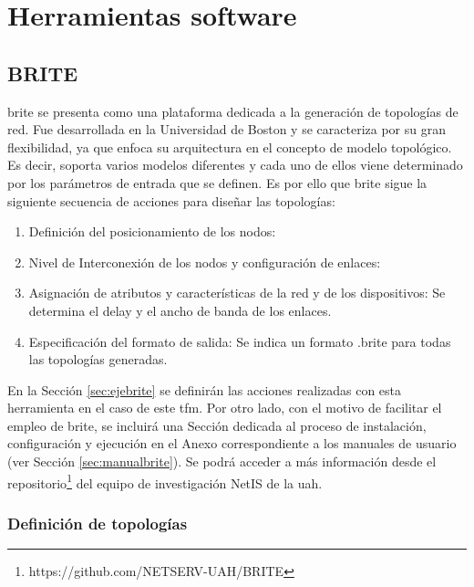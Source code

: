 \section{Herramientas software}
\label{sec:software}

\subsection{BRITE}
\label{sec:brite}

\gls{brite} \cite{brite} se presenta como una plataforma dedicada a la generación de topologías de red. Fue desarrollada en la Universidad de Boston y se caracteriza por su gran flexibilidad, ya que enfoca su arquitectura en el concepto de modelo topológico. Es decir, soporta varios modelos diferentes y cada uno de ellos viene determinado por los parámetros de entrada que se definen. Es por ello que \gls{brite} sigue la siguiente secuencia de acciones para diseñar las topologías:

\vspace{3mm}

\begin{enumerate}
    \item Definición del posicionamiento de los nodos:
    \item Nivel de Interconexión de los nodos y configuración de enlaces:
    \item Asignación de atributos y características de la red y de los dispositivos: Se determina el delay y el ancho de banda de los enlaces.
    \item Especificación del formato de salida: Se indica un formato .brite para todas las topologías generadas.
\end{enumerate}

\vspace{3mm}

En la Sección \ref{sec:ejebrite} se definirán las acciones realizadas con esta herramienta en el caso de este \gls{tfm}. Por otro lado, con el motivo de facilitar el empleo de \gls{brite}, se incluirá una Sección dedicada al proceso de instalación, configuración y ejecución en el Anexo correspondiente a los manuales de usuario (ver Sección \ref{sec:manualbrite}). Se podrá acceder a más información desde el repositorio\footnote{https://github.com/NETSERV-UAH/BRITE} del equipo de investigación NetIS de la \gls{uah}.

\subsubsection{Definición de topologías}
\label{sec:param}

